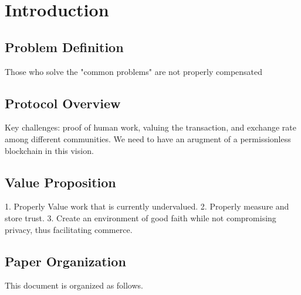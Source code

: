 \section{\textbf{Introduction}}

\subsection{Problem Definition}

Those who solve the "common problems" are not properly compensated

\subsection{Protocol Overview}

Key challenges: proof of human work, valuing the transaction, and exchange rate among different communities. We need to have an arugment of a permissionless blockchain in this vision. 

\subsection{Value Proposition}

1. Properly Value work that is currently undervalued. 2. Properly measure and store trust. 3. Create an environment of good faith while not compromising privacy, thus facilitating commerce. 

\subsection{Paper Organization}

This document is organized as follows.

\newpage
\newpage
